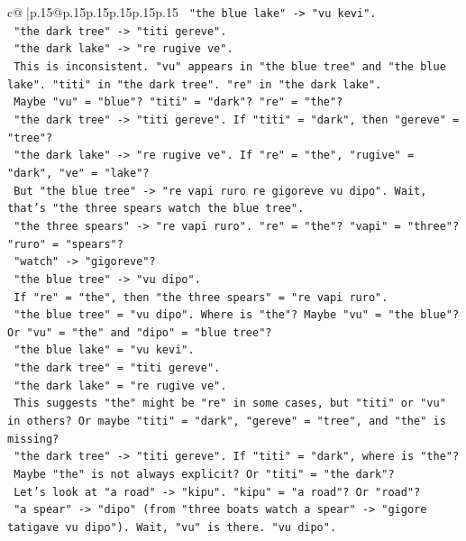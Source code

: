 \documentclass{article}
\begin{document}
{\begin{supertabular}{c@{$\;$}|p{.15\linewidth}@{}p{.15\linewidth}p{.15\linewidth}p{.15\linewidth}p{.15\linewidth}p{.15\linewidth}}
{{{\texttt{    "the blue lake" {-}> "vu kevi".} \\
\texttt{    "the dark tree" {-}> "titi gereve".} \\
\texttt{    "the dark lake" {-}> "re rugive ve".} \\
\texttt{    This is inconsistent. "vu" appears in "the blue tree" and "the blue lake". "titi" in "the dark tree". "re" in "the dark lake".} \\
\texttt{    Maybe "vu" = "blue"? "titi" = "dark"? "re" = "the"?} \\
\texttt{    "the dark tree" {-}> "titi gereve". If "titi" = "dark", then "gereve" = "tree"?} \\
\texttt{    "the dark lake" {-}> "re rugive ve". If "re" = "the", "rugive" = "dark", "ve" = "lake"?} \\
\texttt{    But "the blue tree" {-}> "re vapi ruro re gigoreve vu dipo". Wait, that's "the three spears watch the blue tree".} \\
\texttt{    "the three spears" {-}> "re vapi ruro". "re" = "the"? "vapi" = "three"? "ruro" = "spears"?} \\
\texttt{    "watch" {-}> "gigoreve"?} \\
\texttt{    "the blue tree" {-}> "vu dipo".} \\
\texttt{    If "re" = "the", then "the three spears" = "re vapi ruro".} \\
\texttt{    "the blue tree" = "vu dipo". Where is "the"? Maybe "vu" = "the blue"? Or "vu" = "the" and "dipo" = "blue tree"?} \\
\texttt{    "the blue lake" = "vu kevi".} \\
\texttt{    "the dark tree" = "titi gereve".} \\
\texttt{    "the dark lake" = "re rugive ve".} \\
\texttt{    This suggests "the" might be "re" in some cases, but "titi" or "vu" in others? Or maybe "titi" = "dark", "gereve" = "tree", and "the" is missing?} \\
\texttt{    "the dark tree" {-}> "titi gereve". If "titi" = "dark", where is "the"?} \\
\texttt{    Maybe "the" is not always explicit? Or "titi" = "the dark"?} \\
\texttt{    Let's look at "a road" {-}> "kipu". "kipu" = "a road"? Or "road"?} \\
\texttt{    "a spear" {-}> "dipo" (from "three boats watch a spear" {-}> "gigore tatigave vu dipo"). Wait, "vu" is there. "vu dipo".} \\
}}}
\end{supertabular}}
\end{document}
